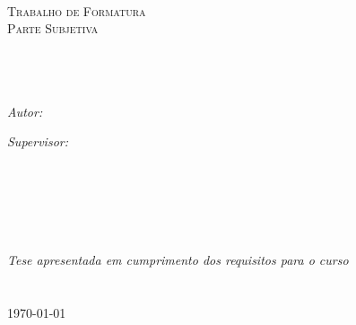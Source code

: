 \documentclass[
11pt, %
brazilian, %
singlespacing, %
]{MastersDoctoralThesis} %
\author{Antonio R. de Campos Junior} %
\begin{document}
\frontmatter %

\pagestyle{plain} %


\begin{titlepage}
\begin{center}

\textsc{\LARGE \univname}\\[1.5cm] %
\textsc{\Large Trabalho de Formatura \\ Parte Subjetiva}\\[0.5cm] %

\HRule \\[0.4cm] %
{\huge \bfseries \ttitle}\\[0.4cm] %
\HRule \\[1.5cm] %
 
\begin{minipage}{0.4\textwidth}
\begin{flushleft} \large
\emph{Autor:}\\
\href{http://www.ime.usp.br/~arcjr}{\authorname} %
\end{flushleft}
\end{minipage}
\begin{minipage}{0.4\textwidth}
\begin{flushright} \large
\emph{Supervisor:} \\
\href{http://www.ime.usp.br/~cef/}{\supname} %
\end{flushright}
\end{minipage}\\[3cm]
\leavevmode \\
\leavevmode \\
\leavevmode \\
\leavevmode \\

\large \textit{Tese apresentada em cumprimento dos requisitos para o curso \\ \degreename}\\[0.3cm] %
\deptname\\[2cm] %
 
{\large \today}\\[4cm] %
 
\vfill
\end{center}
\end{titlepage}
\end{document}
